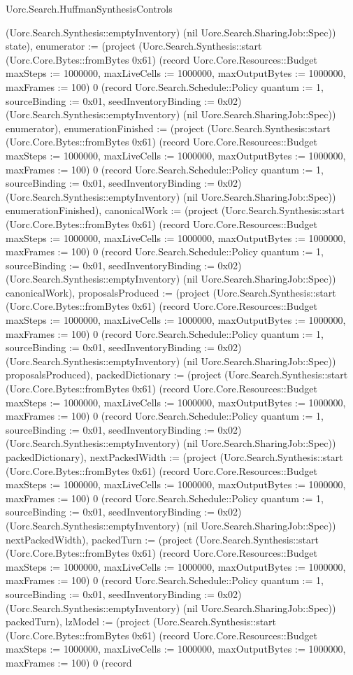 \begin{lexlean}{Uorc.Search.HuffmanSynthesisControls}
\begin{semanticmodule}
{(Uorc.Search.Synthesis::emptyInventory) (nil Uorc.Search.SharingJob::Spec)) state), enumerator := (project (Uorc.Search.Synthesis::start (Uorc.Core.Bytes::fromBytes 0x61) (record Uorc.Core.Resources::Budget {maxSteps := 1000000, maxLiveCells := 1000000, maxOutputBytes := 1000000, maxFrames := 100}) 0 (record Uorc.Search.Schedule::Policy {quantum := 1, sourceBinding := 0x01, seedInventoryBinding := 0x02}) (Uorc.Search.Synthesis::emptyInventory) (nil Uorc.Search.SharingJob::Spec)) enumerator), enumerationFinished := (project (Uorc.Search.Synthesis::start (Uorc.Core.Bytes::fromBytes 0x61) (record Uorc.Core.Resources::Budget {maxSteps := 1000000, maxLiveCells := 1000000, maxOutputBytes := 1000000, maxFrames := 100}) 0 (record Uorc.Search.Schedule::Policy {quantum := 1, sourceBinding := 0x01, seedInventoryBinding := 0x02}) (Uorc.Search.Synthesis::emptyInventory) (nil Uorc.Search.SharingJob::Spec)) enumerationFinished), canonicalWork := (project (Uorc.Search.Synthesis::start (Uorc.Core.Bytes::fromBytes 0x61) (record Uorc.Core.Resources::Budget {maxSteps := 1000000, maxLiveCells := 1000000, maxOutputBytes := 1000000, maxFrames := 100}) 0 (record Uorc.Search.Schedule::Policy {quantum := 1, sourceBinding := 0x01, seedInventoryBinding := 0x02}) (Uorc.Search.Synthesis::emptyInventory) (nil Uorc.Search.SharingJob::Spec)) canonicalWork), proposalsProduced := (project (Uorc.Search.Synthesis::start (Uorc.Core.Bytes::fromBytes 0x61) (record Uorc.Core.Resources::Budget {maxSteps := 1000000, maxLiveCells := 1000000, maxOutputBytes := 1000000, maxFrames := 100}) 0 (record Uorc.Search.Schedule::Policy {quantum := 1, sourceBinding := 0x01, seedInventoryBinding := 0x02}) (Uorc.Search.Synthesis::emptyInventory) (nil Uorc.Search.SharingJob::Spec)) proposalsProduced), packedDictionary := (project (Uorc.Search.Synthesis::start (Uorc.Core.Bytes::fromBytes 0x61) (record Uorc.Core.Resources::Budget {maxSteps := 1000000, maxLiveCells := 1000000, maxOutputBytes := 1000000, maxFrames := 100}) 0 (record Uorc.Search.Schedule::Policy {quantum := 1, sourceBinding := 0x01, seedInventoryBinding := 0x02}) (Uorc.Search.Synthesis::emptyInventory) (nil Uorc.Search.SharingJob::Spec)) packedDictionary), nextPackedWidth := (project (Uorc.Search.Synthesis::start (Uorc.Core.Bytes::fromBytes 0x61) (record Uorc.Core.Resources::Budget {maxSteps := 1000000, maxLiveCells := 1000000, maxOutputBytes := 1000000, maxFrames := 100}) 0 (record Uorc.Search.Schedule::Policy {quantum := 1, sourceBinding := 0x01, seedInventoryBinding := 0x02}) (Uorc.Search.Synthesis::emptyInventory) (nil Uorc.Search.SharingJob::Spec)) nextPackedWidth), packedTurn := (project (Uorc.Search.Synthesis::start (Uorc.Core.Bytes::fromBytes 0x61) (record Uorc.Core.Resources::Budget {maxSteps := 1000000, maxLiveCells := 1000000, maxOutputBytes := 1000000, maxFrames := 100}) 0 (record Uorc.Search.Schedule::Policy {quantum := 1, sourceBinding := 0x01, seedInventoryBinding := 0x02}) (Uorc.Search.Synthesis::emptyInventory) (nil Uorc.Search.SharingJob::Spec)) packedTurn), lzModel := (project (Uorc.Search.Synthesis::start (Uorc.Core.Bytes::fromBytes 0x61) (record Uorc.Core.Resources::Budget {maxSteps := 1000000, maxLiveCells := 1000000, maxOutputBytes := 1000000, maxFrames := 100}) 0 (record }
\end{semanticmodule}
\end{lexlean}
